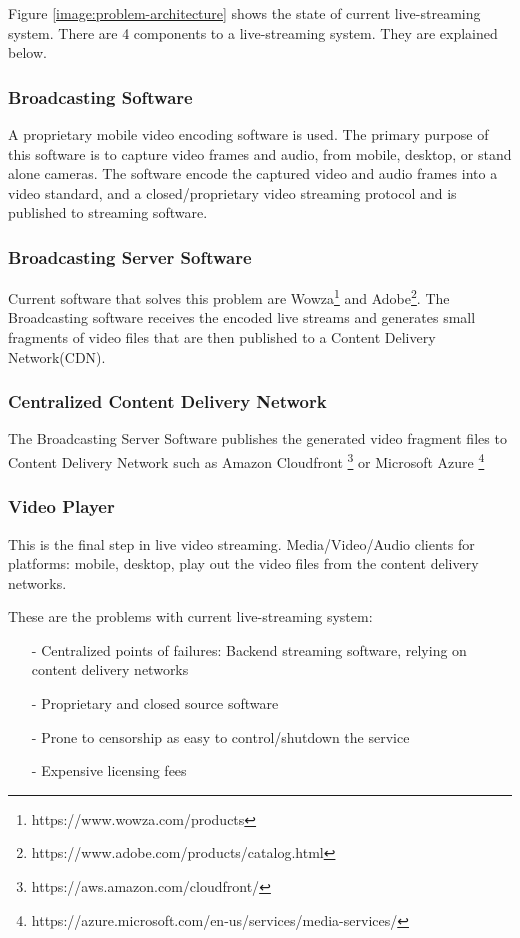 \documentclass{article}
\begin{document}
Figure \ref{image:problem-architecture} shows the state of current live-streaming system. There are 4 components to a live-streaming system. They are explained below.
\subsubsection{Broadcasting Software}
A proprietary mobile video encoding software is used. The primary purpose of this software is to capture video frames and audio, from mobile, desktop, or stand alone cameras. The software encode the captured video and audio frames into a video standard, and a closed/proprietary video streaming protocol and is published to streaming software.

\subsubsection{Broadcasting Server Software}
Current software that solves this problem are Wowza\footnote{https://www.wowza.com/products} and Adobe\footnote{https://www.adobe.com/products/catalog.html}. The Broadcasting software receives the encoded live streams and generates small fragments of video files that are then published to a Content Delivery Network(CDN).

\subsubsection{Centralized Content Delivery Network}
The Broadcasting Server Software publishes the generated video fragment files to Content Delivery Network such as Amazon Cloudfront \footnote{https://aws.amazon.com/cloudfront/} or Microsoft Azure \footnote{https://azure.microsoft.com/en-us/services/media-services/}

\subsubsection{Video Player}
This is the final step in live video streaming. Media/Video/Audio clients for platforms: mobile, desktop, play out the video files from the content delivery networks.


These are the problems with current live-streaming system:
\begin{itemize}
 \item[-]Centralized points of failures: Backend streaming software, relying on content delivery networks
 \item[-]Proprietary and closed source software
 \item[-]Prone to censorship as easy to control/shutdown the service
 \item[-]Expensive licensing fees
\end{itemize}
\end{document}
